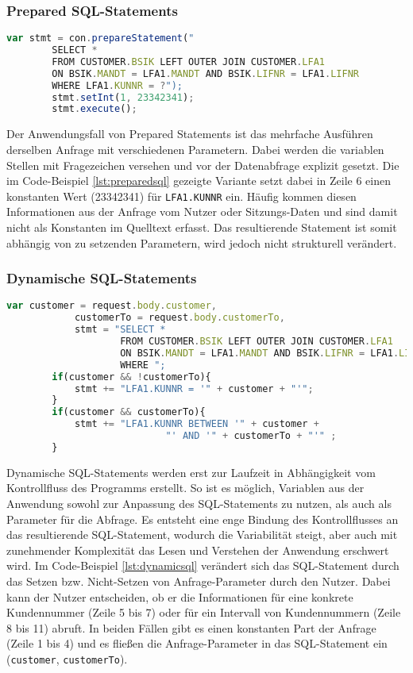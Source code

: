 \subsubsection{Prepared SQL-Statements}

	\begin{lstlisting}[caption={Prepared Statements eingebettet im Quelltext}, label={lst:preparedsql}, language=JavaScript]
		var stmt = con.prepareStatement("
		SELECT *
		FROM CUSTOMER.BSIK LEFT OUTER JOIN CUSTOMER.LFA1
		ON BSIK.MANDT = LFA1.MANDT AND BSIK.LIFNR = LFA1.LIFNR
		WHERE LFA1.KUNNR = ?");
		stmt.setInt(1, 23342341);
		stmt.execute();
	\end{lstlisting}

Der Anwendungsfall von Prepared Statements ist das mehrfache Ausführen derselben Anfrage mit verschiedenen Parametern.
Dabei werden die variablen Stellen mit Fragezeichen versehen und vor der Datenabfrage explizit gesetzt.
Die im Code-Beispiel \ref{lst:preparedsql} gezeigte Variante setzt dabei in Zeile 6 einen konstanten Wert (23342341) für \texttt{LFA1.KUNNR} ein.
Häufig kommen diesen Informationen aus der Anfrage vom Nutzer oder Sitzungs-Daten und sind damit nicht als Konstanten im Quelltext erfasst.
Das resultierende Statement ist somit abhängig von zu setzenden Parametern, wird jedoch nicht strukturell verändert.

\subsubsection{Dynamische SQL-Statements}

	\begin{lstlisting}[caption={Dynamische SQL-Statements können verschiedene Ausprägungen annehmen.}, label={lst:dynamicsql}, language=JavaScript]
		var customer = request.body.customer,
		    customerTo = request.body.customerTo,
		    stmt = "SELECT *
					FROM CUSTOMER.BSIK LEFT OUTER JOIN CUSTOMER.LFA1
					ON BSIK.MANDT = LFA1.MANDT AND BSIK.LIFNR = LFA1.LIFNR
					WHERE ";
		if(customer && !customerTo){
			stmt += "LFA1.KUNNR = '" + customer + "'";
		}
		if(customer && customerTo){
			stmt += "LFA1.KUNNR BETWEEN '" + customer +
							"' AND '" + customerTo + "'" ;
		}
	\end{lstlisting}

Dynamische SQL-Statements werden erst zur Laufzeit in Abhängigkeit vom Kontrollfluss des Programms erstellt.
So ist es möglich, Variablen aus der Anwendung sowohl zur Anpassung des SQL-Statements zu nutzen, als auch als Parameter für die Abfrage.
Es entsteht eine enge Bindung des Kontrollflusses an das resultierende SQL-Statement, wodurch die Variabilität steigt, aber auch mit zunehmender Komplexität das Lesen und Verstehen der Anwendung erschwert wird.
Im Code-Beispiel \ref{lst:dynamicsql} verändert sich das SQL-Statement durch das Setzen bzw. Nicht-Setzen von Anfrage-Parameter durch den Nutzer.
Dabei kann der Nutzer entscheiden, ob er die Informationen für eine konkrete Kundennummer (Zeile 5 bis 7) oder für ein Intervall von Kundennummern (Zeile 8 bis 11) abruft.
In beiden Fällen gibt es einen konstanten Part der Anfrage (Zeile 1 bis 4) und es fließen die Anfrage-Parameter in das SQL-Statement ein (\texttt{customer}, \texttt{customerTo}).

